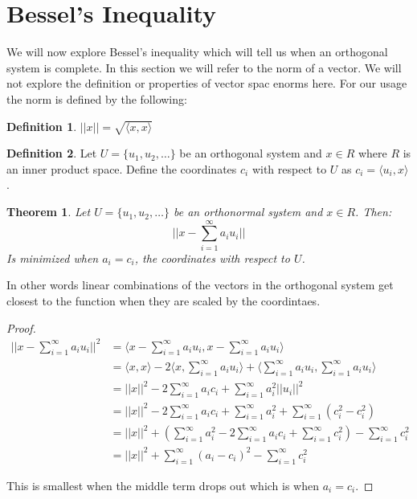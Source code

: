 \documentclass{article}
\newtheorem{theorem}{Theorem}
\theoremstyle{definition}
\newtheorem{definition}{Definition}
\theoremstyle{definition}
\begin{document}
\section{Bessel's Inequality}

We will now explore Bessel's inequality which will tell us when an orthogonal system is complete. In this section we will refer to the norm of a vector. We will not explore the definition or properties of vector spac enorms here. For our usage the norm is defined by the following:

\begin{definition}
    $||x||=\sqrt{\langle x, x \rangle}$
\end{definition}

\begin{definition}
    Let $U=\{u_{1}, u_{2}, \ldots \}$ be an orthogonal system and $x\in R$ where $R$ is an inner product space. Define the coordinates $c_{i}$ with respect to $U$ as $c_{i}=\langle u_{i}, x \rangle$.
\end{definition}

\begin{theorem}
    Let $U=\{u_{1}, u_{2}, \ldots \}$ be an orthonormal system and $x\in R$. Then: 
    $$||x - \sum_{i=1}^{\infty} a_{i}u_{i}||$$
    Is minimized when $a_{i}=c_{i}$, the coordinates with respect to $U$.
\end{theorem}

In other words linear combinations of the vectors in the orthogonal system get closest to the function when they are scaled by the coordintaes.

\begin{proof}
    \begin{equation}
    \begin{split}
        ||x - \sum_{i=1}^{\infty} a_{i}u_{i}||^{2}&=\langle x - \sum_{i=1}^{\infty} a_{i}u_{i}, x - \sum_{i=1}^{\infty} a_{i}u_{i} \rangle \\
        &= \langle x, x \rangle - 2\langle x, \sum_{i=1}^{\infty} a_{i}u_{i} \rangle + \langle \sum_{i=1}^{\infty} a_{i}u_{i}, \sum_{i=1}^{\infty} a_{i}u_{i} \rangle \\
        &= ||x||^{2} - 2\sum_{i=1}^{\infty} a_{i}c_{i} + \sum_{i=1}^{\infty} a_{i}^{2}||u_{i}||^{2} \\
        &= ||x||^{2} - 2\sum_{i=1}^{\infty} a_{i}c_{i} + \sum_{i=1}^{\infty} a_{i}^{2} + \sum_{i=1}^{\infty} (c_{i}^{2} - c_{i}^{2}) \\
        &= ||x||^{2} + (\sum_{i=1}^{\infty} a_{i}^{2} - 2\sum_{i=1}^{\infty} a_{i}c_{i} + \sum_{i=1}^{\infty} c_{i}^{2}) - \sum_{i=1}^{\infty} c_{i}^{2} \\
        &= ||x||^{2} + \sum_{i=1}^{\infty} (a_{i} - c_{i})^{2} - \sum_{i=1}^{\infty} c_{i}^{2} 
    \end{split}
    \end{equation}
   
    This is smallest when the middle term drops out which is when $a_{i} = c_{i}$.
\end{proof}
\end{document}
